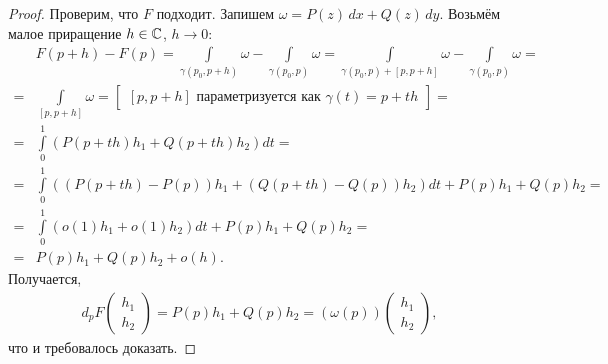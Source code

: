 \begin{proof}
 Проверим, что $F$  подходит. Запишем $\omega = P(z)\,dx + Q(z)\,dy$. Возьмём малое приращение $h \in \mathbb{C}$, $h \to 0$:
 \begin{align*}
  &F(p + h) - F(p) = \int\limits_{\gamma(p_0,p + h)}  \omega - \int\limits_{\gamma(p_0,p)}  \omega = \int\limits_{\gamma(p_0,p) + [p,p+h]} \omega - \int\limits_{\gamma(p_0,p)}   \omega = \\
  = &\int\limits_{[p,p+h]}  \omega = \begin{bmatrix}
   [p,p+h] \text{ параметризуется как } \gamma(t) = p + th
  \end{bmatrix} = \\
  = &\int\limits_{0}^{1} \left( P(p+th) h_1 + Q(p+th) h_2 \right)dt = \\
  = &\int\limits_{0}^{1} \left( \left( P(p+th) - P(p) \right)h_1 + \left( Q(p+th)-Q(p) \right)h_2 \right)dt + P(p)h_1 + Q(p)h_2 = \\
  = & \int\limits_{0}^{1} \left( o(1)h_1 + o(1)h_2 \right)dt + P(p)h_1 + Q(p)h_2 = \\
  = &P(p)h_1 + Q(p)h_2 + o(h)
 .\end{align*} Получается,
 \begin{align*}
  d_p F \begin{pmatrix}
   h_1 \\ h_2
  \end{pmatrix} = P(p) h_1 + Q(p) h_2 = \left( \omega(p) \right) \begin{pmatrix}
   h_1 \\ h_2
  \end{pmatrix}
 ,\end{align*} что и требовалось доказать.
\end{proof}

